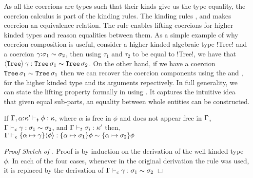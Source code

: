 \documentclass[manuscript,screen,nonacm]{acmart}
\begin{document}
As all the coercions are types such that their kinds give us the type equality, the coercion calculus is part of the kinding rules. The kinding rules ,   and  makes coercion an equivalence relation. The rule  enables lifting coercions for higher kinded types and reason equalities between them. As a simple example of why coercion composition is useful, consider a higher kinded algebraic type !Tree! and a coercion $\gamma{:}\sigma_1\sim\sigma_2$, then using $\tau_1$ and $\tau_2$ to be equal to !Tree!, we have that $\langle\texttt{Tree}\rangle \,\gamma : \texttt{Tree}\,\sigma_1 \sim \texttt{Tree}\,\sigma_2$.
On the other hand, if we have a coercion $\texttt{Tree}\,\sigma_1 \sim \texttt{Tree}\,\sigma_1$ then we can recover the coercion components using the  and , for the higher kinded type and its arguments repectively. In full generality, we can state the lifting property formally in \SFC using .
It captures the intuitive idea that given equal sub-parts, an equality between whole entities can be constructed.
\begin{theorem}\label{thm:sfc-coercion-lifting}
  If $\Gamma,\alpha{:}\kappa' \vdash_{t} \phi : \kappa$, where $\alpha$ is free in $\phi$
  and does not appear free in $\Gamma$, 
  $\Gamma \vdash_{c} \gamma : \sigma_1\sim\sigma_2$, and $\Gamma \vdash_{t} \sigma_i : \kappa'$
  then, $\Gamma \vdash_{c} \{\alpha\mapsto \gamma\}\langle\phi\rangle : \{\alpha\mapsto\sigma_1\}\phi \sim \{\alpha\mapsto\sigma_2\}\phi$
\end{theorem}
\begin{proof}[Proof Sketch of ]
  Proof is by induction on the derivation of the well kinded type $\phi$. In each of the four cases, whenever in the original derivation the rule  was used, it is replaced by the derivation of $\Gamma \vdash_{c} \gamma : \sigma_1 \sim \sigma_2$ %
\end{proof}
\end{document}
